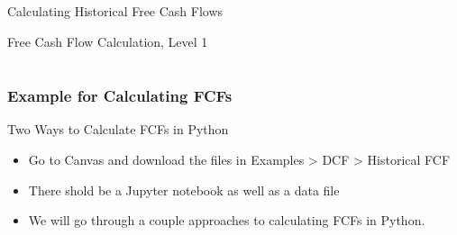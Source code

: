 \documentclass[handout, 11pt]{beamer}
\begin{document}
\begin{section}{Calculating Historical Free Cash Flows}
\begin{frame}
{\begin{block}{Free Cash Flow Calculation, Level 1}
\begin{tabular*}{\textwidth}{@{\extracolsep{\fill}}ccccc}
\end{tabular*}
\end{block}
}
\label{labs:calculate-fcf-lab-1}
\end{frame}
\begin{frame}
\frametitle{Example for Calculating FCFs}
{
\begin{block}{Two Ways to Calculate FCFs in Python}
\begin{itemize}
\item Go to Canvas and download the files in Examples > DCF > Historical FCF
\item There shold be a Jupyter notebook as well as a data file
\item We will go through a couple approaches to calculating FCFs in Python.
\end{itemize}
\end{block}
}
\end{frame}
\end{section}
\end{document}
